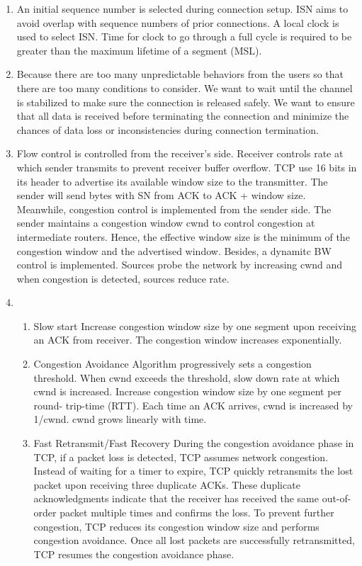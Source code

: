 \documentclass{article}
\begin{document}
\begin{enumerate}
    \item
    An initial sequence number is selected during connection setup. ISN aims to avoid overlap with sequence numbers of prior connections. A local clock is used to select ISN. Time for clock to go through a full cycle is required to be greater than the maximum lifetime of a segment (MSL).
    
    \item
    Because there are too many unpredictable behaviors from the users so that there are too many conditions to consider. We want to wait until the channel is stabilized to make sure the connection is released safely. We want to ensure that all data is received before terminating the connection and minimize the chances of data loss or inconsistencies during connection termination.

    \item
    Flow control is controlled from the receiver's side.
    Receiver controls rate at which sender transmits to prevent receiver buffer overflow.
    TCP use 16 bits in its header to advertise its available window size to the transmitter. The sender will send bytes with SN from ACK to ACK + window size.
    \newline
    Meanwhile, congestion control is implemented from the sender side. The sender maintains a congestion window cwnd to control congestion at intermediate routers. Hence, the effective window size is the minimum of the congestion window and the advertised window. Besides, a dynamitc BW control is implemented. Sources probe the network by increasing cwnd and when congestion is detected, sources reduce rate.
    \item
    \begin{enumerate}
        \item Slow start
        \newline Increase congestion window size by one segment upon receiving an ACK from receiver. The congestion window increases exponentially.
        
        \item Congestion Avoidance
        \newline
        Algorithm progressively sets a congestion threshold. When cwnd exceeds the threshold, slow down rate at which cwnd is increased. Increase congestion window size by one segment per round- trip-time (RTT). Each time an ACK arrives, cwnd is increased by 1/cwnd. cwnd grows linearly with time.
        
        \item Fast Retransmit/Fast Recovery
        \newline
During the congestion avoidance phase in TCP, if a packet loss is detected, TCP assumes network congestion. Instead of waiting for a timer to expire, TCP quickly retransmits the lost packet upon receiving three duplicate ACKs. These duplicate acknowledgments indicate that the receiver has received the same out-of-order packet multiple times and confirms the loss. To prevent further congestion, TCP reduces its congestion window size and performs congestion avoidance. Once all lost packets are successfully retransmitted, TCP resumes the congestion avoidance phase.
        

\end{enumerate}
\end{enumerate}
\end{document}
